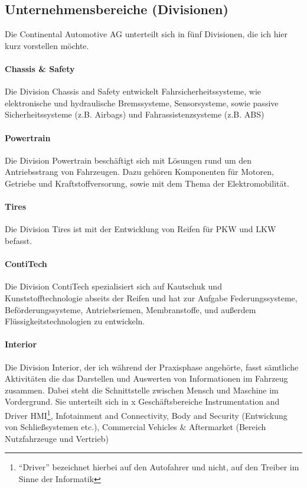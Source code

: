 \subsection{Unternehmensbereiche (Divisionen)}


Die Continental Automotive AG unterteilt sich in fünf Divisionen, die ich hier kurz vorstellen möchte. 

\paragraph{Chassis \& Safety}
Die Division Chassis and Safety entwickelt Fahrsicherheitssysteme, wie elektronische und hydraulische Bremssysteme, Sensorsysteme, sowie passive Sicherheitssysteme (z.B. Airbags) und Fahrassistenzsysteme (z.B. ABS) 

\paragraph{Powertrain}
Die Division Powertrain beschäftigt sich mit Lösungen rund um den Antriebsstrang von Fahrzeugen. Dazu gehören Komponenten für Motoren, Getriebe und Kraftstoffversorung, sowie mit dem Thema der Elektromobilität. 

\paragraph{Tires}
Die Division Tires ist mit der Entwicklung von Reifen für PKW und LKW befasst. 
\paragraph{ContiTech}
Die Division ContiTech spezialisiert sich auf Kautschuk und Kunststofftechnologie abseits der Reifen und hat zur Aufgabe Federungssysteme, Beförderungssysteme, Antriebsriemen, Membranstoffe, und außerdem Flüssigkeitstechnologien zu entwickeln. 

\paragraph{Interior}
Die Division Interior, der ich während der Praxisphase angehörte, fasst sämtliche Aktivitäten die das Darstellen und Auswerten von Informationen im Fahrzeug zusammen. Dabei steht die Schnittstelle zwischen Mensch und Maschine im Vordergrund.
Sie unterteilt sich in x Geschäftsbereiche Instrumentation and Driver HMI\footnote{"`Driver"' bezeichnet hierbei auf den Autofahrer und nicht, auf den Treiber im Sinne der Informatik}, Infotainment and Connectivity, 
Body and Security (Entwickung von Schließsystemen etc.), 
Commercial Vehicles \& Aftermarket (Bereich Nutzfahrzeuge und Vertrieb)


